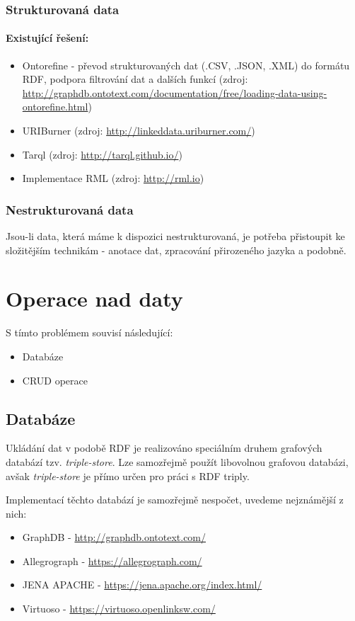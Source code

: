\subsubsection{Strukturovaná data}
\paragraph{Existující řešení:}
\begin{itemize}
\item Ontorefine - převod strukturovaných dat (.CSV, .JSON, .XML) do formátu RDF, podpora filtrování dat a dalších funkcí (zdroj: \url{http://graphdb.ontotext.com/documentation/free/loading-data-using-ontorefine.html})
\item URIBurner (zdroj: \url{http://linkeddata.uriburner.com/})
\item Tarql (zdroj: \url{http://tarql.github.io/})
\item Implementace RML (zdroj: \url{http://rml.io})
\end{itemize}
\subsubsection{Nestrukturovaná data}
Jsou-li data, která máme k dispozici nestrukturovaná, je potřeba přistoupit ke složitějším technikám - anotace dat, zpracování přirozeného jazyka a podobně.\par

\section{Operace nad daty}
S tímto problémem souvisí následující:
\begin{itemize}
    \item Databáze
    \item CRUD operace
\end{itemize}

\subsection{Databáze}
Ukládání dat v podobě RDF je realizováno speciálním druhem grafových databází tzv. \textit{triple-store}. Lze samozřejmě použít libovolnou grafovou databázi, avšak \textit{triple-store} je přímo určen pro práci s RDF triply.\par
\noindent Implementací těchto databází je samozřejmě nespočet, uvedeme nejznámější z nich:\par
\begin{itemize}
\item GraphDB - \url{http://graphdb.ontotext.com/}
\item Allegrograph - \url{https://allegrograph.com/}
\item JENA APACHE - \url{https://jena.apache.org/index.html/}
\item Virtuoso - \url{https://virtuoso.openlinksw.com/}
\end{itemize}

